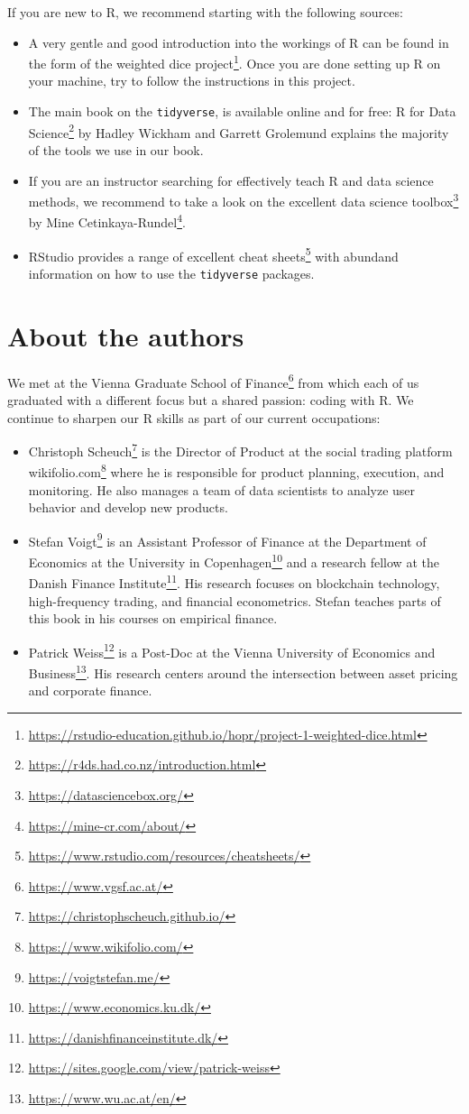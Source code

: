 \documentclass[
]{book}
\providecommand{\tightlist}{%
  \setlength{\itemsep}{0pt}\setlength{\parskip}{0pt}}
\renewcommand{\href}[2]{#2\footnote{\url{#1}}}
\begin{document}
If you are new to R, we recommend starting with the following sources:

\begin{itemize}
\tightlist
\item
  A very gentle and good introduction into the workings of R can be found in the form of the \href{https://rstudio-education.github.io/hopr/project-1-weighted-dice.html}{weighted dice project}. Once you are done setting up R on your machine, try to follow the instructions in this project.
\item
  The main book on the \texttt{tidyverse}, \citet{Wickham2016} is available online and for free: \href{https://r4ds.had.co.nz/introduction.html}{R for Data Science} by Hadley Wickham and Garrett Grolemund explains the majority of the tools we use in our book.
\item
  If you are an instructor searching for effectively teach R and data science methods, we recommend to take a look on the excellent \href{https://datasciencebox.org/}{data science toolbox} by \href{https://mine-cr.com/about/}{Mine Cetinkaya-Rundel}.
\item
  RStudio provides a range of excellent \href{https://www.rstudio.com/resources/cheatsheets/}{cheat sheets} with abundand information on how to use the \texttt{tidyverse} packages.
\end{itemize}

\hypertarget{about-the-authors}{%
\section*{About the authors}\label{about-the-authors}}


We met at the \href{https://www.vgsf.ac.at/}{Vienna Graduate School of Finance} from which each of us graduated with a different focus but a shared passion: coding with R. We continue to sharpen our R skills as part of our current occupations:

\begin{itemize}
\tightlist
\item
  \href{https://christophscheuch.github.io/}{Christoph Scheuch} is the Director of Product at the social trading platform \href{https://www.wikifolio.com/}{wikifolio.com} where he is responsible for product planning, execution, and monitoring. He also manages a team of data scientists to analyze user behavior and develop new products.
\item
  \href{https://voigtstefan.me/}{Stefan Voigt} is an Assistant Professor of Finance at the \href{https://www.economics.ku.dk/}{Department of Economics at the University in Copenhagen} and a research fellow at the \href{https://danishfinanceinstitute.dk/}{Danish Finance Institute}. His research focuses on blockchain technology, high-frequency trading, and financial econometrics. Stefan teaches parts of this book in his courses on empirical finance.
\item
  \href{https://sites.google.com/view/patrick-weiss}{Patrick Weiss} is a Post-Doc at the \href{https://www.wu.ac.at/en/}{Vienna University of Economics and Business}. His research centers around the intersection between asset pricing and corporate finance.
\end{itemize}
\end{document}
